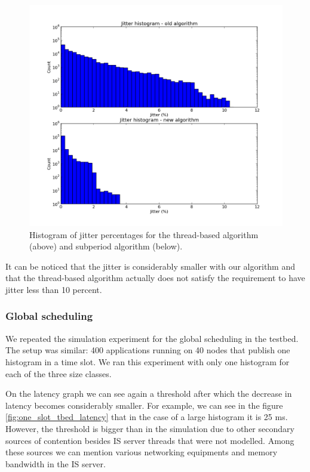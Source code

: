 \begin{figure}[ht]
\centering
\includegraphics[scale=0.55]{Images/jitter_histo.png}
\caption{Histogram of jitter percentages for the thread-based algorithm (above) and subperiod algorithm (below).}
\label{fig:jitter_histo}
\end{figure}

It can be noticed that the jitter is considerably smaller with our algorithm and that the thread-based algorithm actually does not satisfy the requirement to have jitter less than 10 percent.

\subsubsection*{Global scheduling}

We repeated the simulation experiment for the global scheduling in the testbed. The setup was similar: 400 applications running on 40 nodes that publish one histogram in a time slot. We ran this experiment with only one histogram for each of the three size classes. 

On the latency graph we can see again a threshold after which the decrease in latency becomes considerably smaller. For example, we can see in the figure \ref{fig:one_slot_tbed_latency} that in the case of a large histogram it is 25 ms. However, the threshold is bigger than in the simulation due to other secondary sources of contention besides IS server threads that were not modelled. Among these sources we can mention various networking equipments and memory bandwidth in the IS server.

